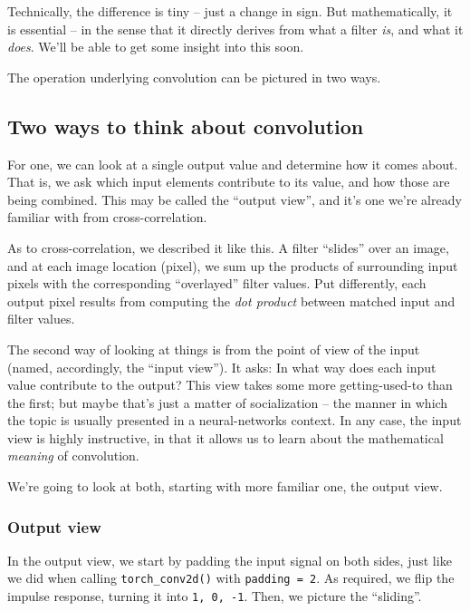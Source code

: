 \documentclass[
  letterpaper,
]{krantz}
\begin{document}
Technically, the difference is tiny -- just a change in sign. But
mathematically, it is essential -- in the sense that it directly derives
from what a filter \emph{is}, and what it \emph{does}. We'll be able to
get some insight into this soon.

The operation underlying convolution can be pictured in two ways.

\hypertarget{two-ways-to-think-about-convolution}{%
\subsection{\texorpdfstring{Two ways to think about
convolution}{Two ways to think about convolution}}\label{two-ways-to-think-about-convolution}}

For one, we can look at a single output value and determine how it comes
about. That is, we ask which input elements contribute to its value, and
how those are being combined. This may be called the ``output view'',
and it's one we're already familiar with from cross-correlation.

As to cross-correlation, we described it like this. A filter ``slides''
over an image, and at each image location (pixel), we sum up the
products of surrounding input pixels with the corresponding
``overlayed'' filter values. Put differently, each output pixel results
from computing the \emph{dot product} between matched input and filter
values.

The second way of looking at things is from the point of view of the
input (named, accordingly, the ``input view''). It asks: In what way
does each input value contribute to the output? This view takes some
more getting-used-to than the first; but maybe that's just a matter of
socialization -- the manner in which the topic is usually presented in a
neural-networks context. In any case, the input view is highly
instructive, in that it allows us to learn about the mathematical
\emph{meaning} of convolution.

We're going to look at both, starting with more familiar one, the output
view.

\hypertarget{output-view}{%
\subsubsection{Output view}\label{output-view}}

In the output view, we start by padding the input signal on both sides,
just like we did when calling \texttt{torch\_conv2d()} with
\texttt{padding\ =\ 2}. As required, we flip the impulse response,
turning it into \texttt{1,\ 0,\ -1}. Then, we picture the ``sliding''.
\end{document}
